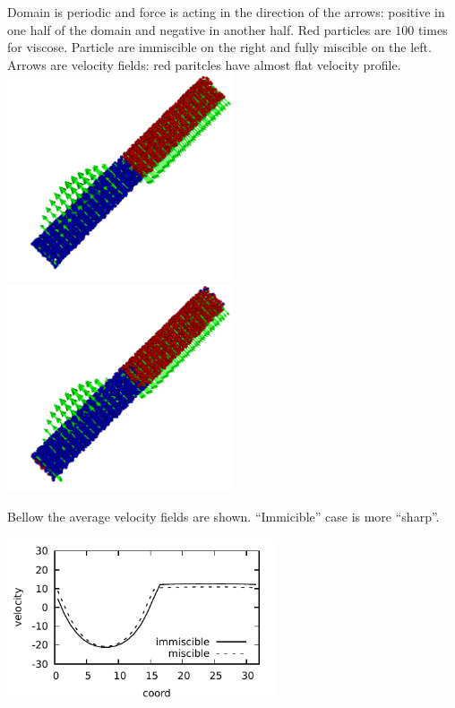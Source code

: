 Domain is periodic and force is acting in the direction of the arrows:
positive in one half of the domain and negative in another half.  Red
particles are $100$ times for viscose. Particle are immiscible on the
right and fully miscible on the left. Arrows are velocity fields: red
paritcles have almost flat velocity profile.
\includegraphics[width=0.5\textwidth]{i/flow/a/visit.png}
\includegraphics[width=0.5\textwidth]{i/flow/b/visit.png}


Bellow the average velocity fields are shown. ``Immicible'' case is
more ``sharp''.

\begin{center}
\includegraphics[width=0.6\textwidth]{i/flow/prof.pdf}
\end{center}
